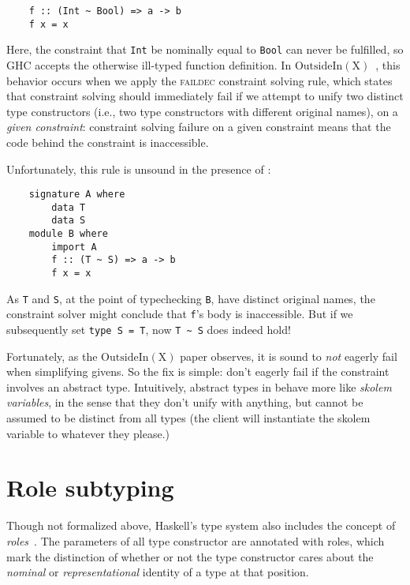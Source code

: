 \begin{lstlisting}
    f :: (Int ~ Bool) => a -> b
    f x = x
\end{lstlisting}
%
Here, the constraint that \verb|Int| be nominally equal to \verb|Bool|
can never be fulfilled, so GHC accepts the otherwise ill-typed
function definition.  In $\mathrm{OutsideIn(X)}$~\cite{Vytiniotis:2011:OMT:2139531.2139533},
this behavior occurs when we apply the \textsc{faildec} constraint
solving rule, which states that
constraint solving should immediately fail if we attempt to unify
two distinct type constructors (i.e., two type constructors with
different original names), on a \emph{given
constraint}: constraint solving failure on a given constraint means that
the code behind the constraint is inaccessible.

Unfortunately, this rule is unsound in the presence of \Backpack{}:

\begin{lstlisting}
    signature A where
        data T
        data S
    module B where
        import A
        f :: (T ~ S) => a -> b
        f x = x
\end{lstlisting}

As \verb|T| and \verb|S|, at the point of typechecking \verb|B|, have
distinct original names, the constraint solver might conclude that
\verb|f|'s body is inaccessible.  But if we subsequently set
\verb|type S = T|, now \verb|T ~ S| does indeed hold!

Fortunately, as the $\mathrm{OutsideIn(X)}$ paper observes, it is sound
to \emph{not} eagerly fail when simplifying givens.  So the fix is simple:
don't eagerly fail if the constraint involves an abstract type.
Intuitively, abstract types in \Backpack{} behave more like \emph{skolem
variables}, in the sense that they don't unify with anything, but cannot
be assumed to be distinct from all types (the client will instantiate
the skolem variable to whatever they please.)

\section{Role subtyping}

Though not formalized above, Haskell's type system also includes the
concept of \emph{roles}~\cite{Weirich:2011:GTA:1925844.1926411,Breitner:2014:SZC:2692915.2628141}.  The parameters of all type constructor are annotated with roles,
which mark the distinction of whether or not the type constructor
cares about the \emph{nominal} or \emph{representational} identity
of a type at that position.

